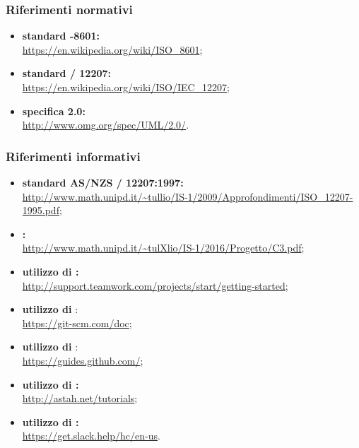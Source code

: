         \subsubsection{Riferimenti normativi}
        \begin{itemize}
            \item \textbf{standard -8601:}\\ \url{https://en.wikipedia.org/wiki/ISO_8601}; \label{sec:iso8601}
            \item \textbf{standard / 12207:}\\ \url{https://en.wikipedia.org/wiki/ISO/IEC_12207};
            \item \textbf{specifica  2.0:}\\ \url{http://www.omg.org/spec/UML/2.0/}.
        \end{itemize}

        \subsubsection{Riferimenti informativi}
        \begin{itemize}
            \item \textbf{standard AS/NZS / 12207:1997:}\\ \url{http://www.math.unipd.it/~tullio/IS-1/2009/Approfondimenti/ISO_12207-1995.pdf}; \label{sec:isoiec}
            \item \textbf{:}\\ \url{http://www.math.unipd.it/~tulXlio/IS-1/2016/Progetto/C3.pdf};
            \item \textbf{utilizzo di :}\\ \url{http://support.teamwork.com/projects/start/getting-started};
            \item \textbf{utilizzo di }:\\ \url{https://git-scm.com/doc};
            \item \textbf{utilizzo di }:\\ \url{https://guides.github.com/};
            \item \textbf{utilizzo di :}\\ \url{http://astah.net/tutorials};
            \item \textbf{utilizzo di :}\\ \url{https://get.slack.help/hc/en-us}.
        \end{itemize}
